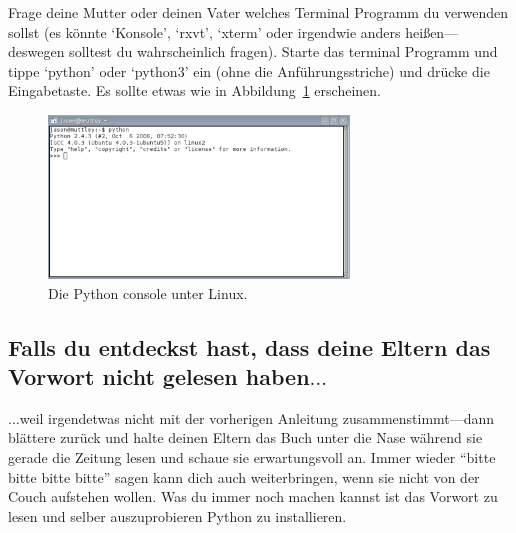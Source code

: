 \begin{LINUX}
Frage deine Mutter oder deinen Vater welches Terminal Programm du verwenden sollst (es könnte `Konsole', `rxvt', `xterm' oder irgendwie anders heißen---deswegen solltest du wahrscheinlich fragen). Starte das terminal Programm und tippe `python' oder `python3' ein (ohne die Anführungsstriche) und drücke die Eingabetaste. Es sollte etwas wie in Abbildung~\ref{fig4} erscheinen.

\begin{figure}
\begin{center}
\includegraphics[width=80mm]{images/figure4}
\end{center}
\caption{Die Python console unter Linux.}\label{fig4}
\end{figure}
\end{LINUX}

\subsection*{\color{BrickRed}Falls du entdeckst hast, dass deine Eltern das Vorwort nicht gelesen haben$\ldots$}

$\ldots$weil irgendetwas nicht mit der vorherigen Anleitung zusammenstimmt---dann blättere zurück und halte deinen Eltern das Buch unter die Nase während sie gerade die Zeitung lesen und schaue sie erwartungsvoll an. Immer wieder ``bitte bitte bitte bitte'' sagen kann dich auch weiterbringen, wenn sie nicht von der Couch aufstehen wollen. Was du immer noch machen kannst ist das Vorwort zu lesen und selber auszuprobieren Python zu installieren.


